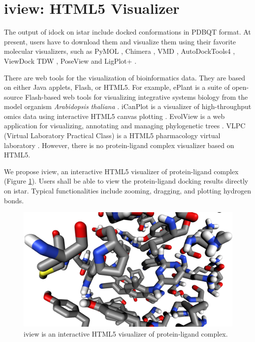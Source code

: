 \section{iview: HTML5 Visualizer}

The output of idock on istar include docked conformations in PDBQT format. At present, users have to download them and visualize them using their favorite molecular visualizers, such as PyMOL \citep{1221}, Chimera \citep{1219}, VMD \citep{1220}, AutoDockTools4 \citep{596}, ViewDock TDW \citep{559}, PoseView \citep{748} and LigPlot+ \citep{951}.

There are web tools for the visualization of bioinformatics data. They are based on either Java applets, Flash, or HTML5. For example, ePlant is a suite of open-source Flash-based web tools for visualizing integrative systems biology from the model organism \textit{Arabidopsis thaliana} \citep{1242}. iCanPlot is a visualizer of high-throughput omics data using interactive HTML5 canvas plotting \citep{1028}. EvolView is a web application for visualizing, annotating and managing phylogenetic trees \citep{1241}. VLPC (Virtual Laboratory Practical Class) is a HTML5 pharmacology virtual laboratory \citep{1249}. However, there is no protein-ligand complex visualizer based on HTML5.

We propose iview, an interactive HTML5 visualizer of protein-ligand complex (Figure \ref{istar:iview}). Users shall be able to view the protein-ligand docking results directly on istar. Typical functionalities include zooming, dragging, and plotting hydrogen bonds.

\begin{figure}
\centering
\includegraphics[width=\linewidth]{istar/iview.png}
\caption{iview is an interactive HTML5 visualizer of protein-ligand complex.}
\label{istar:iview}
\end{figure}


